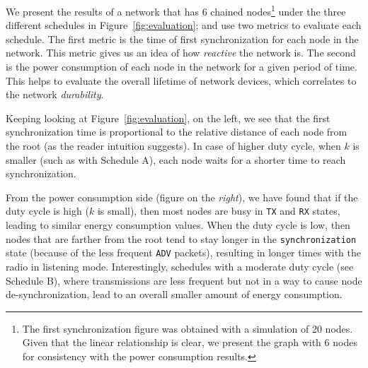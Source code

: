 We present the results of a network that has 6 chained nodes\footnote{The first synchronization figure was obtained with a simulation of 20 nodes. Given that the linear relationship is clear, we present the graph with 6 nodes for consistency with the power consumption results.} under the three different schedules in Figure~\ref{fig:evaluation}; and use two metrics to evaluate each schedule. The first metric is the time of first synchronization for each node in the network. This metric gives us an idea of how \emph{reactive} the network is. The second is the power consumption of each node in the network for a given period of time. This helps to evaluate the overall lifetime of network devices, which correlates to the network {\em durability}.

Keeping looking at Figure~\ref{fig:evaluation}, on the left, we see that the first synchronization time is proportional to the relative distance of each node from the root (as the reader intuition suggests). In case of higher duty cycle, when $k$ is smaller (such as with Schedule A), each node waits for a shorter time to reach synchronization. 

From the power consumption side (figure on the {\em right}), we have found that if the duty cycle is high ($k$ is small), then most nodes are busy in \texttt{TX} and \texttt{RX} states, leading to similar energy consumption values. When the duty cycle is low, then nodes that are farther from the root tend to stay longer in the \texttt{synchronization} state (because of the less frequent \texttt{ADV} packets), resulting in longer times with the radio in listening mode. Interestingly, schedules with a moderate duty cycle (see Schedule B), where transmissions are less frequent but not in a way to cause node de-synchronization, lead to an overall smaller amount of energy consumption. 

